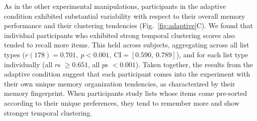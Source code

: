 \documentclass[11pt]{article}
\newcommand{\abbreviations}{S1}
\begin{document}
As in the other experimental manipulations, participants in the adaptive
condition exhibited substantial variability with respect to their overall
memory performance and their clustering tendencies (Fig.~\ref{fig:adaptive}C).
We found that individual participants who exhibited strong temporal clustering
scores also tended to recall more items. This held across subjects, aggregating
across all list types ($r(178) = 0.701,~p < 0.001,~\mathrm{CI} = [0.590,~
0.789]$), and for each list type individually (all $r$s $\geq 0.651$, all $p$s
$< 0.001$). Taken together, the results from the adaptive condition suggest
that each participant comes into the experiment with their own unique memory
organization tendencies, as characterized by their memory fingerprint. When
participants study lists whose items come pre-sorted according to their unique
preferences, they tend to remember more and show stronger temporal clustering.

\begin{table}[tp]
\centering
\tiny


\caption{\textbf{Ranked clustering scores versus ``chance'' for participants in
the feature-rich condition.} For each participant, we sorted their clustering
scores in descending order (for each of the six feature dimensions, along with
a seventh dimension to capture temporal clustering). The $t$-tests reported in
the table (for the clustering scores at each ``rank'') were carried out
across-participants, and reflect data aggregated across all lists from each
participant. Abbreviations used in this table are defined in
Table~\abbreviations.}

\label{tab:ranked-clustering}
\end{table}
\end{document}
